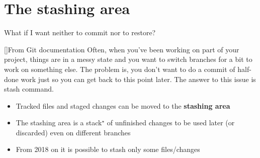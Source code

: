 \documentclass[usenames,svgnames,14pt]{beamer}
\begin{document}
\section{The stashing area}
\begin{frame}{What if I want neither to commit nor to restore?}
    \begin{varblock}{}[\textwidth]{From Git documentation}
        Often, when you’ve been working on part of your project, things are in a messy state and you want to switch branches for a bit to work on something else. The problem is, you don’t want to do a commit of half-done work just so you can get back to this point later. The answer to this issue is \textbf{} stash command.
    \end{varblock}
    \setlength{\leftmargini}{4mm}
    \begin{itemize}
        \item \alert{Tracked files and staged changes} can be moved to the \textbf{stashing area}
        \item The stashing area is a stack$^\star$ of unfinished changes to be used later (or discarded) even on different branches
        \item From 2018 on it is possible to stash only some files/changes
    \end{itemize}
\end{frame}
\end{document}
